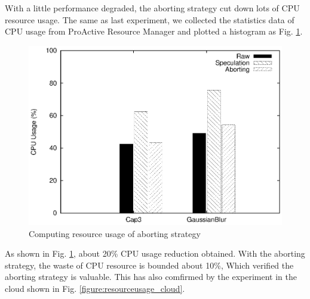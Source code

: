 With a little performance degraded, the aborting strategy cut down lots of CPU resource usage. The same as last experiment, we collected the statistics data of CPU usage from ProActive Resource Manager and plotted a histogram as Fig. \ref{figure:abort_resourceusage}.

\begin{figure}
\centering
\includegraphics[width=0.9\columnwidth]{figures/abort_resource_usage.eps}
\caption{Computing resource usage of aborting strategy}
\label{figure:abort_resourceusage}
\end{figure}

As shown in Fig. \ref{figure:abort_resourceusage}, about 20\% CPU usage reduction obtained. With the aborting strategy, the waste of CPU resource is bounded about 10\%, Which verified the aborting strategy is valuable. This has also comfirmed by the experiment in the cloud shown in Fig. \ref{figure:resourceusage_cloud}. 
